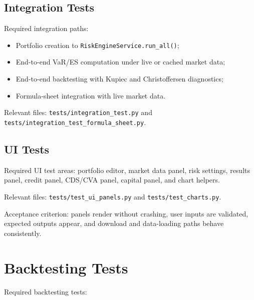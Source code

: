 \documentclass[11pt]{article}
\newcommand{\code}[1]{\texttt{#1}}
\begin{document}
\subsection{Integration Tests}

Required integration paths:

\begin{itemize}
  \item Portfolio creation to \code{RiskEngineService.run\_all()};
  \item End-to-end VaR/ES computation under live or cached market data;
  \item End-to-end backtesting with Kupiec and Christoffersen diagnostics;
  \item Formula-sheet integration with live market data.
\end{itemize}

Relevant files: \code{tests/integration\_test.py} and
\code{tests/integration\_test\_formula\_sheet.py}.

\subsection{UI Tests}

Required UI test areas: portfolio editor, market data panel, risk
settings, results panel, credit panel, CDS/CVA panel, capital panel,
and chart helpers.

Relevant files: \code{tests/test\_ui\_panels.py} and
\code{tests/test\_charts.py}.

Acceptance criterion: panels render without crashing, user inputs are
validated, expected outputs appear, and download and data-loading paths
behave consistently.

\section{Backtesting Tests}

Required backtesting tests:
\end{document}
